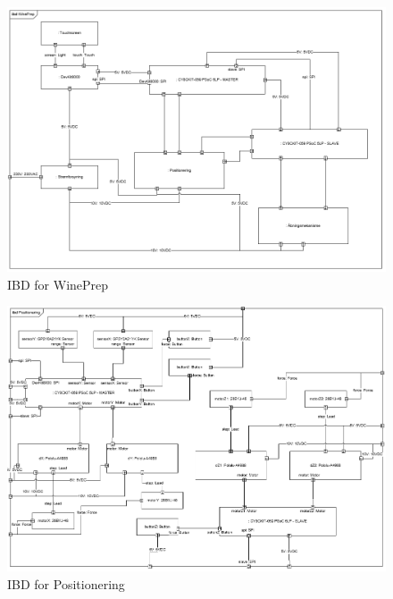 \begin{figure}[H]
	\centering
	\includegraphics[scale=0.4]{IBD_Win}
	\caption{IBD for WinePrep}
	\label{IBD_Win}
\end{figure}

\begin{figure}[H]
	\centering
	\includegraphics[scale=0.4]{IBD_Pos}
	\caption{IBD for Positionering}
	\label{IBD_Pos}
\end{figure}

